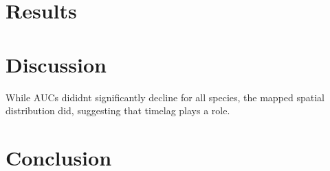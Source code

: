 \documentclass[manuscript, 3p,
authoryear]{elsarticle} %
\begin{document}
\hypertarget{results}{%
\section{Results}\label{results}}

\hypertarget{discussion}{%
\section{Discussion}\label{discussion}}

While AUCs dididnt significantly decline for all species, the mapped
spatial distribution did, suggesting that timelag plays a role.

\hypertarget{conclusion}{%
\section{Conclusion}\label{conclusion}}


\end{document}
